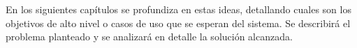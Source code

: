En los siguientes capítulos se profundiza en estas ideas, detallando cuales son los objetivos de alto nivel o casos de uso que se esperan del sistema. Se describirá el problema planteado y se analizará en detalle la solución alcanzada.\\ \\

\\

\afterpage{\null\newpage}
\newpage

